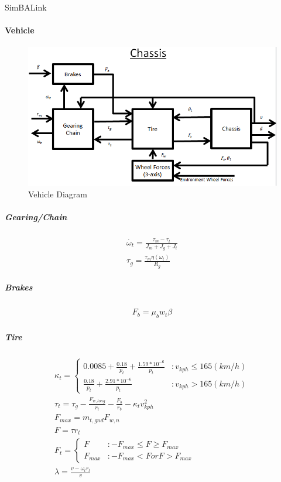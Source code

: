 \documentclass[12pt,letterpaper]{report}
\author{Nathan}
\begin{document}
\begin{center}


SimBALink

\end{center}

\paragraph{Vehicle}
\begin{figure}[H]
  \centering
  \includegraphics[scale=.75]{Vehicle_Diagram}
  \caption{Vehicle Diagram}
\end{figure}

\subparagraph{Gearing/Chain}

\begin{gather}
\dot{\omega_t} = \frac{\tau_m - \tau_t}{J_m + J_g + J_t} \\
\tau_g = \frac{\tau_m \eta (\omega_t)}{R_g}
\end{gather}

\subparagraph{Brakes}

\begin{gather}
F_b = \mu_b w_t \beta
\end{gather}

\subparagraph{Tire}

\begin{gather}
\kappa_t = 
\left\{
  \begin{array}{lr}
    0.0085 + \frac{0.18}{p_t} + \frac{1.59*10^{-6}}{p_t} & : v_{kph} \le 165 (km/h)\\
    \frac{0.18}{p_t} + \frac{2.91*10^{-6}}{p_t} & : v_{kph} > 165 (km/h)
  \end{array}
\right. \\
\tau_t = \tau_g - \frac{F_{w,long}}{r_t} - \frac{F_b}{r_b} - \kappa_t v_{kph}^2 \\
F_{max} = m_{t,gnd} F_{w,n} \\
F = \tau r_t \\
F_t =
\left\{
  \begin{array}{lr}
	F & : -F_{max} \le F \ge F_{max} \\
	F_{max} & : -F_{max} < F or F > F_{max}
  \end{array}
\right. \\
\lambda = \frac{v - \omega_t r_t}{v}
\end{gather}
\end{document}
